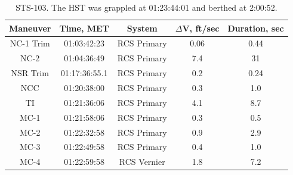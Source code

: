 \documentclass[paper=letter, fontsize=11pt]{scrartcl} %
\numberwithin{equation}{section} %
\numberwithin{figure}{section} %
\numberwithin{table}{section} %
\begin{document}
\begin{table}[H]
    \begin{center}
        \begin{tabular}{|c |c |c |c |c|}
            \hline
            Maneuver  & Time, MET     & System      & $\Delta$V, ft/sec & Duration, sec \\
            \hline
            NC-1 Trim & 01:03:42:23   & RCS Primary & 0.06              & 0.44          \\ \hline
            NC-2      & 01:04:36:49   & RCS Primary & 7.4               & 31            \\ \hline
            NSR Trim  & 01:17:36:55.1 & RCS Primary & 0.2               & 0.24          \\ \hline
            NCC       & 01:20:38:00   & RCS Primary & 0.3               & 1.0           \\ \hline
            TI        & 01:21:36:06   & RCS Primary & 4.1               & 8.7           \\ \hline
            MC-1      & 01:21:58:06   & RCS Primary & 0.3               & 0.5           \\ \hline
            MC-2      & 01:22:32:58   & RCS Primary & 0.9               & 2.9           \\ \hline
            MC-3      & 01:22:49:58   & RCS Primary & 0.4               & 1.0           \\ \hline
            MC-4      & 01:22:59:58   & RCS Vernier & 1.8               & 7.2           \\ \hline
        \end{tabular}
    \end{center}
    \caption{STS-103. The HST was grappled at 01:23:44:01 and berthed at 2:00:52.}
\end{table}
\end{document}
